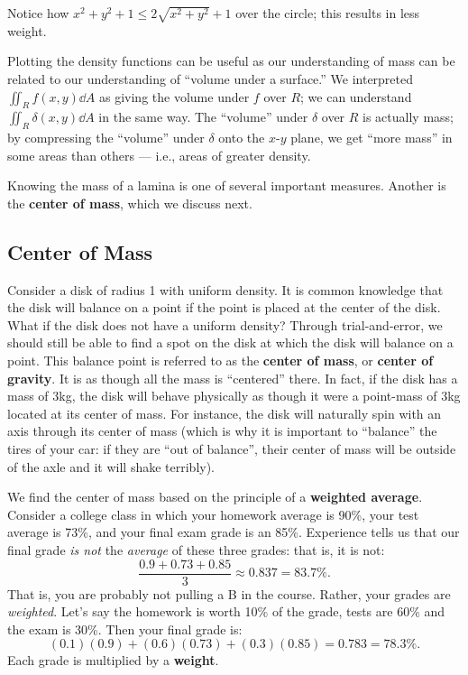 \begin{example}
Notice how $x^2+y^2+1 \leq 2\sqrt{x^2+y^2}+1$ over the circle; this results in less weight.
\end{example}

Plotting the density functions can be useful as our understanding of mass can be related to our understanding of ``volume under a surface.'' We interpreted $\iint_R f(x,y)\dd A$ as giving the volume under $f$ over $R$; we can understand $\iint_R\delta(x,y)\dd A$ in the same way. The ``volume'' under $\delta$ over $R$ is actually mass; by compressing the ``volume'' under $\delta$ onto the $x$-$y$ plane, we get ``more mass'' in some areas than others --- i.e., areas of greater density.

Knowing the mass of a lamina is one of several important measures. Another is the \textbf{center of mass}, which we discuss next.

\subsection{Center of Mass}

Consider a disk of radius 1 with uniform density. It is common knowledge that the disk will balance on a point if the point is placed at the center of the disk. What if the disk does not have a uniform density? Through trial-and-error, we should still be able to find a spot on the disk at which the disk will balance on a point. This balance point is referred to as the \textbf{center of mass}, or \textbf{center of gravity}. It is as though all the mass is ``centered'' there. In fact, if the disk has a mass of 3kg, the disk will behave physically as though it were a point-mass of 3kg located at its center of mass. For instance, the disk will naturally spin with an axis through its center of mass (which is why it is important to ``balance'' the tires of your car: if they are ``out of balance'', their center of mass will be outside of the axle and it will shake terribly).

We find the center of mass based on the principle of a \textbf{weighted average}. Consider a college class in which your homework average is 90\%, your test average is 73\%, and your final exam grade is an 85\%. Experience tells us that our final grade \emph{is not} the \emph{average} of these three grades: that is, it is not:
\[\frac{0.9+0.73+0.85}{3} \approx 0.837 = 83.7\text{\%}.\]
That is, you are probably not pulling a B in the course. Rather, your grades are \emph{weighted}. Let's say the homework is worth 10\% of the grade, tests are 60\% and the exam is 30\%. Then your final grade is:
\[(0.1)(0.9) + (0.6)(0.73)+(0.3)(0.85) = 0.783 = 78.3\text{\%}.\]
Each grade is multiplied by a \textbf{weight}. 

